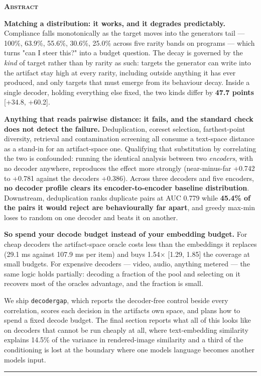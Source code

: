 \documentclass[
  10pt,
]{article}
\theoremstyle{plain}
\theoremstyle{definition}
\newenvironment{iclrabstract}
  {\vspace{0.4em}\begin{center}{\bfseries\scshape Abstract}\end{center}
   \begin{list}{}{\setlength{\leftmargin}{0.45in}\setlength{\rightmargin}{0.45in}}\item[]\relax}
  {\end{list}\vspace{0.6em}}
\begin{document}
\begin{iclrabstract}
\textbf{Matching a distribution: it works, and it degrades predictably.}
Compliance falls monotonically as the target moves into the
generator\textquotesingle s tail --- 100\%, 63.9\%, 55.6\%, 30.6\%,
25.0\% across five rarity bands on programs --- which turns "can I steer
this?" into a budget question. The decay is governed by the \emph{kind}
of target rather than by rarity as such: targets the generator can write
into the artifact stay high at every rarity, including outside anything
it has ever produced, and only targets that must emerge from its
behaviour decay. Inside a single decoder, holding everything else fixed,
the two kinds differ by \textbf{47.7 points} {[}+34.8, +60.2{]}.

\textbf{Anything that reads pairwise distance: it fails, and the
standard check does not detect the failure.} Deduplication, coreset
selection, farthest-point diversity, retrieval and contamination
screening all consume a text-space distance as a stand-in for an
artifact-space one. Qualifying that substitution by correlating the two
is confounded: running the identical analysis between two
\emph{encoders}, with no decoder anywhere, reproduces the effect more
strongly (near-minus-far +0.742 to +0.781 against the
decoder\textquotesingle s +0.386). Across three decoders and five
encoders, \textbf{no decoder profile clears its encoder-to-encoder
baseline distribution}. Downstream, deduplication ranks duplicate pairs
at AUC 0.779 while \textbf{45.4\% of the pairs it would reject are
behaviourally far apart}, and greedy max-min loses to random on one
decoder and beats it on another.

\textbf{So spend your decode budget instead of your embedding budget.}
For cheap decoders the artifact-space oracle costs less than the
embeddings it replaces (29.1 ms against 107.9 ms per item) and buys
1.54× {[}1.29, 1.85{]} the coverage at small budgets. For expensive
decoders --- video, audio, anything metered --- the same logic holds
partially: decoding a fraction of the pool and selecting on it recovers
most of the oracle\textquotesingle s advantage, and the fraction is
small.

We ship \texttt{decodergap}, which reports the decoder-free control
beside every correlation, scores each decision in the
artifact\textquotesingle s own space, and plans how to spend a fixed
decode budget. The final section reports what all of this looks like on
decoders that cannot be run cheaply at all, where text-embedding
similarity explains 14.5\% of the variance in rendered-image similarity
and a third of the conditioning is lost at the boundary where one
model\textquotesingle s language becomes another model\textquotesingle s
input.

\begin{center}\rule{0.5\linewidth}{0.5pt}\end{center}

\end{iclrabstract}
\end{document}
